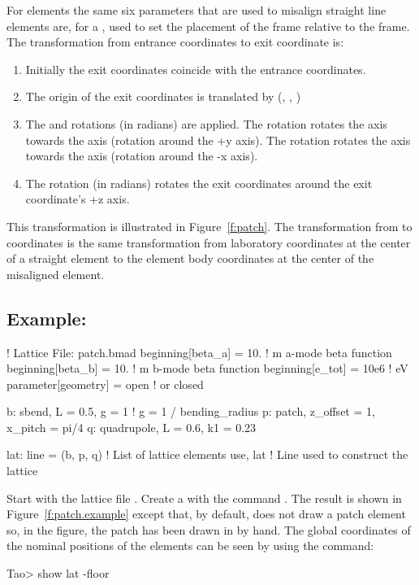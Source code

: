 \documentclass{hitec}     %
\begin{document}
{For  elements the same six parameters that are used to misalign straight line elements
are, for a , used to set the placement of the  frame relative to the 
frame. The transformation from entrance coordinates to exit coordinate is:
\vspace{-5 pt}
\begin{enumerate}
\item Initially the exit coordinates coincide with the entrance coordinates.
\item The origin of the exit coordinates is translated by (, , )
\item The  and  rotations (in radians) are applied. 
The  rotation rotates the  axis
towards the  axis (rotation around the +y axis). The  rotation rotates the  axis
towards the  axis (rotation around the -x axis).
\item The  rotation (in radians) rotates the exit coordinates around the exit coordinate's +z
axis.
\end{enumerate}
This transformation is illustrated in Figure~\ref{f:patch}. The transformation from 
 to  coordinates is the same transformation from laboratory coordinates at the
center of a straight element to the element body coordinates at the center of the misaligned
element.

\subsection{Example:}
\begin{code}
! Lattice File: patch.bmad
beginning[beta_a] = 10.   ! m  a-mode beta function
beginning[beta_b] = 10.   ! m  b-mode beta function
beginning[e_tot] = 10e6   ! eV
parameter[geometry] = open  ! or closed

b: sbend, L = 0.5, g = 1    ! g = 1 / bending_radius
p: patch, z_offset = 1, x_pitch = pi/4
q: quadrupole, L = 0.6, k1 = 0.23

lat: line = (b, p, q)   ! List of lattice elements
use, lat                ! Line used to construct the lattice
\end{code}

Start \tao with the lattice file . Create a
 with the command . The result is shown in
Figure~\ref{f:patch.example} except that, by default, \tao does not draw a patch element so, in the
figure, the patch has been drawn in by hand. The global coordinates of the nominal positions of the
elements can be seen by using the  command:
\begin{code}
Tao> show lat -floor


\end{code}}
\end{document}
